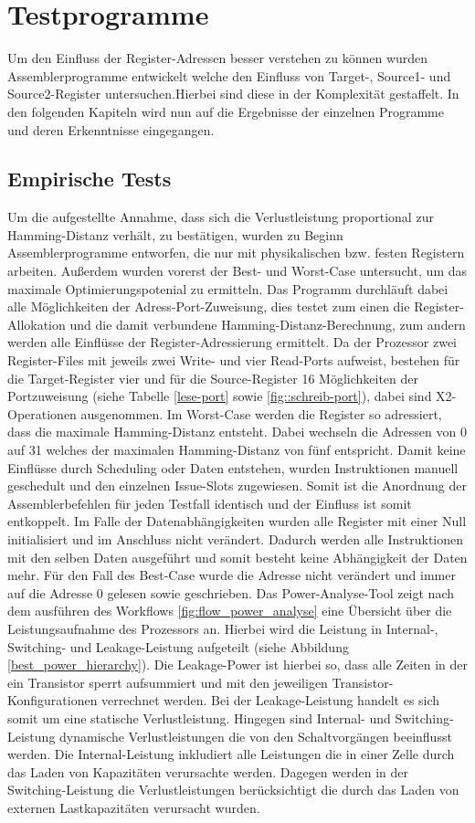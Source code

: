 \section{Testprogramme}
Um den Einfluss der Register-Adressen besser verstehen zu können wurden Assemblerprogramme entwickelt welche den Einfluss von Target-, Source1- und Source2-Register untersuchen.Hierbei sind diese in der Komplexität gestaffelt. In den folgenden Kapiteln wird nun auf die Ergebnisse der einzelnen Programme und deren Erkenntnisse eingegangen.
\subsection{Empirische Tests}
\label{cap:empirischeTests}
Um die aufgestellte Annahme, dass sich die Verlustleistung proportional zur Hamming-Distanz verhält, zu bestätigen, wurden zu Beginn Assemblerprogramme entworfen, die nur mit physikalischen bzw. festen Registern arbeiten.
Außerdem wurden vorerst der Best- und Worst-Case untersucht, um das maximale Optimierungspotenial zu ermitteln. Das Programm durchläuft dabei alle Möglichkeiten der Adress-Port-Zuweisung, dies testet zum einen die Register-Allokation und die damit verbundene Hamming-Distanz-Berechnung, zum andern werden alle Einflüsse der Register-Adressierung ermittelt. Da der Prozessor zwei Register-Files mit jeweils zwei Write- und vier Read-Ports aufweist, bestehen für die Target-Register vier und für die Source-Register 16 Möglichkeiten der Portzuweisung (siehe Tabelle \ref{lese-port} sowie \ref{fig::schreib-port}), dabei sind X2-Operationen ausgenommen. Im Worst-Case werden die Register so adressiert, dass die maximale Hamming-Distanz entsteht. Dabei wechseln die Adressen von 0 auf 31 welches der maximalen Hamming-Distanz von fünf entspricht. Damit keine Einflüsse durch Scheduling oder Daten entstehen, wurden Instruktionen manuell geschedult und den einzelnen Issue-Slots zugewiesen. Somit ist die Anordnung der Assemblerbefehlen für jeden Testfall identisch und der Einfluss ist somit entkoppelt. Im Falle der Datenabhängigkeiten wurden alle Register mit einer Null initialisiert und im Anschluss nicht verändert. Dadurch werden alle Instruktionen mit den selben Daten ausgeführt und somit besteht keine Abhängigkeit der Daten mehr.
Für den Fall des Best-Case wurde die Adresse nicht verändert und immer auf die Adresse 0 gelesen sowie geschrieben.
Das Power-Analyse-Tool zeigt nach dem ausführen des Workflows \ref{fig:flow_power_analyse} eine Übersicht über die Leistungsaufnahme des Prozessors an. Hierbei wird die Leistung in Internal-, Switching- und Leakage-Leistung aufgeteilt (siehe Abbildung \ref{best_power_hierarchy}). Die Leakage-Power ist hierbei so, dass alle Zeiten in der ein Transistor sperrt aufsummiert und mit den jeweiligen Transistor-Konfigurationen verrechnet werden. Bei der Leakage-Leistung handelt es sich somit um eine statische Verlustleistung. Hingegen sind Internal- und Switching-Leistung dynamische Verlustleistungen die von den Schaltvorgängen beeinflusst werden. Die Internal-Leistung inkludiert alle Leistungen die in einer Zelle durch das Laden von Kapazitäten verursachte werden. Dagegen werden in der Switching-Leistung die Verlustleistungen berücksichtigt die durch das Laden von externen Lastkapazitäten verursacht wurden.

